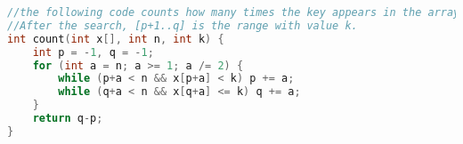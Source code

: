 \begin{lstlisting}[language=C++]
//the following code counts how many times the key appears in the array. 
//After the search, [p+1..q] is the range with value k.
int count(int x[], int n, int k) {
    int p = -1, q = -1;
    for (int a = n; a >= 1; a /= 2) {
        while (p+a < n && x[p+a] < k) p += a;
        while (q+a < n && x[q+a] <= k) q += a;
    }
    return q-p;
}
\end{lstlisting}

